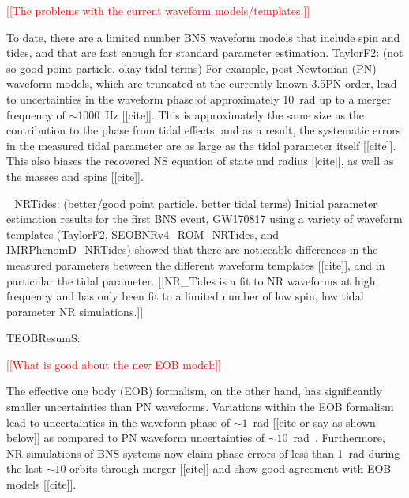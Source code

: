 \documentclass[prd,aps,letter,twocolumn,floatfix,notitlepage,nofootinbib]{revtex4-1}
\newcommand{\red}[1]{\textcolor{red}{#1}}
\begin{document}


\red{[[The problems with the current waveform models/templates.]]}

To date, there are a limited number BNS waveform models that include spin and tides, and that are fast enough for standard parameter estimation.  
TaylorF2: (not so good point particle. okay tidal terms)
For example, post-Newtonian (PN) waveform models, which are truncated at the currently known 3.5PN order, lead to uncertainties in the waveform phase of approximately 10~rad up to a merger frequency of $\sim 1000$~Hz [[cite]]. This is approximately the same size as the contribution to the phase from tidal effects, and as a result, the systematic errors in the measured tidal parameter are as large as the tidal parameter itself [[cite]]. This also biases the recovered NS equation of state and radius [[cite]], as well as the masses and spins [[cite]].

\*\_NRTides: (better/good point particle. better tidal terms)
Initial parameter estimation results for the first BNS event, GW170817 using a variety of waveform templates (TaylorF2, SEOBNRv4\_ROM\_NRTides, and IMRPhenomD\_NRTides) showed that there are noticeable differences in the measured parameters between the different waveform templates [[cite]], and in particular the tidal parameter. [[NR\_Tides is a fit to NR waveforms at high frequency and has only been fit to a limited number of low spin, low tidal parameter NR simulations.]]

TEOBResumS:

\red{[[What is good about the new EOB model:]]}

The effective one body (EOB) formalism, on the other hand, has significantly smaller uncertainties than PN waveforms. Variations within the EOB formalism lead to uncertainties in the waveform phase of $\sim 1$~rad [[cite or say as shown below]] as compared to PN waveform uncertainties of $\sim 10$~rad~\cite{HindererLackeyLangRead2010}. Furthermore, NR simulations of BNS systems now claim phase errors of less than 1~rad during the last $\sim 10$ orbits through merger [[cite]] and show good agreement with EOB models [[cite]]. 
\end{document}
